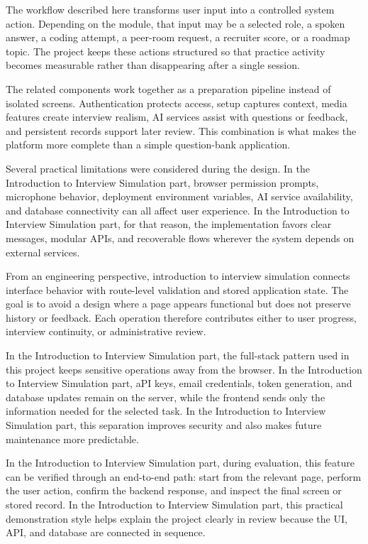 \documentclass[12pt,a4paper]{report}
\begin{document}
The workflow described here transforms user input into a controlled system action. Depending on the module, that input may be a selected role, a spoken answer, a coding attempt, a peer-room request, a recruiter score, or a roadmap topic. The project keeps these actions structured so that practice activity becomes measurable rather than disappearing after a single session.


The related components work together as a preparation pipeline instead of isolated screens. Authentication protects access, setup captures context, media features create interview realism, AI services assist with questions or feedback, and persistent records support later review. This combination is what makes the platform more complete than a simple question-bank application.


Several practical limitations were considered during the design. In the Introduction to Interview Simulation part, browser permission prompts, microphone behavior, deployment environment variables, AI service availability, and database connectivity can all affect user experience. In the Introduction to Interview Simulation part, for that reason, the implementation favors clear messages, modular APIs, and recoverable flows wherever the system depends on external services.


From an engineering perspective, introduction to interview simulation connects interface behavior with route-level validation and stored application state. The goal is to avoid a design where a page appears functional but does not preserve history or feedback. Each operation therefore contributes either to user progress, interview continuity, or administrative review.


In the Introduction to Interview Simulation part, the full-stack pattern used in this project keeps sensitive operations away from the browser. In the Introduction to Interview Simulation part, aPI keys, email credentials, token generation, and database updates remain on the server, while the frontend sends only the information needed for the selected task. In the Introduction to Interview Simulation part, this separation improves security and also makes future maintenance more predictable.


In the Introduction to Interview Simulation part, during evaluation, this feature can be verified through an end-to-end path: start from the relevant page, perform the user action, confirm the backend response, and inspect the final screen or stored record. In the Introduction to Interview Simulation part, this practical demonstration style helps explain the project clearly in review because the UI, API, and database are connected in sequence.
\end{document}
